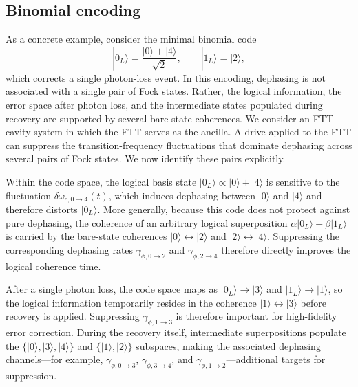 \subsection{Binomial encoding}
\label{subsec:binomial-codes}

As a concrete example, consider the minimal binomial code~\cite{PhysRevX.6.031006Binonmial}
\begin{equation}
|0_L\rangle=\frac{|0\rangle+|4\rangle}{\sqrt{2}},\qquad |1_L\rangle=|2\rangle,
\end{equation}
which corrects a single photon-loss event. In this encoding, dephasing is not associated with a single pair of Fock states. Rather, the logical information, the error space after photon loss, and the intermediate states populated during recovery are supported by several bare-state coherences. We consider an FTT--cavity system in which the FTT serves as the ancilla. A drive applied to the FTT can suppress the transition-frequency fluctuations that dominate dephasing across several pairs of Fock states. We now identify these pairs explicitly.

Within the code space, the logical basis state \( |0_L\rangle \propto |0\rangle + |4\rangle \) is sensitive to the fluctuation \( \delta\widetilde{\omega}_{c,0\rightarrow 4}(t) \), which induces dephasing between \( |0\rangle \) and \( |4\rangle \) and therefore distorts \( |0_L\rangle \). More generally, because this code does not protect against pure dephasing, the coherence of an arbitrary logical superposition \( \alpha|0_L\rangle + \beta|1_L\rangle \) is carried by the bare-state coherences \( |0\rangle\!\leftrightarrow\!|2\rangle \) and \( |2\rangle\!\leftrightarrow\!|4\rangle \). Suppressing the corresponding dephasing rates \( \gamma_{\phi,0\rightarrow 2} \) and \( \gamma_{\phi,2\rightarrow 4} \) therefore directly improves the logical coherence time.

After a single photon loss, the code space maps as \( |0_L\rangle \rightarrow |3\rangle \) and \( |1_L\rangle \rightarrow |1\rangle \), so the logical information temporarily resides in the coherence \( |1\rangle\!\leftrightarrow\!|3\rangle \) before recovery is applied. Suppressing \( \gamma_{\phi,1\rightarrow 3} \) is therefore important for high-fidelity error correction. During the recovery itself, intermediate superpositions populate the \( \{|0\rangle,|3\rangle,|4\rangle\} \) and \( \{|1\rangle,|2\rangle\} \) subspaces, making the associated dephasing channels---for example, \( \gamma_{\phi,0\rightarrow 3} \), \( \gamma_{\phi,3\rightarrow 4} \), and \( \gamma_{\phi,1\rightarrow 2} \)---additional targets for suppression.

